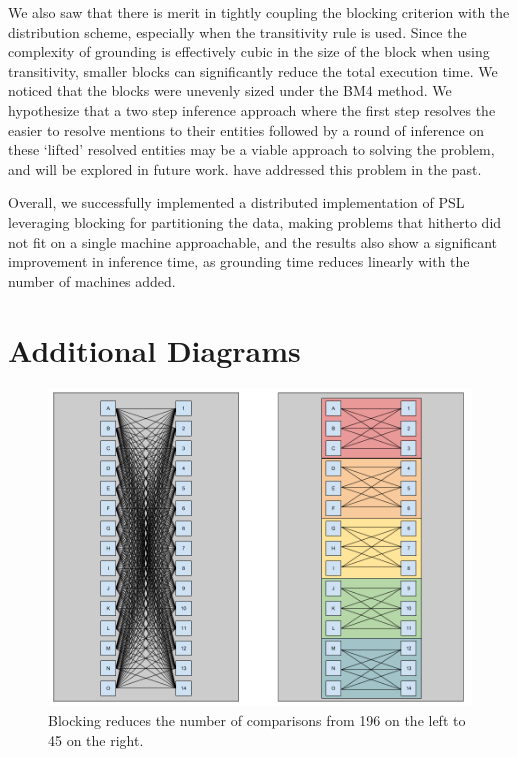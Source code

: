 \documentclass{article}
\begin{document}
    We also saw that there is merit in tightly coupling the blocking criterion with the distribution scheme, especially when the transitivity rule is used. Since the complexity of grounding is effectively cubic in the size of the block when using transitivity, smaller blocks can significantly reduce the total execution time. We noticed that the blocks were unevenly sized under the BM4 method. We hypothesize that a two step inference approach where the first step resolves the easier to resolve mentions to their entities followed by a round of inference on these `lifted' resolved entities may be a viable approach to solving the problem, and will be explored in future work. \cite{wick2009entity} have addressed this problem in the past.
    
    Overall, we successfully implemented a distributed implementation of PSL leveraging blocking for partitioning the data, making problems that hitherto did not fit on a single machine approachable, and the results also show a significant improvement in inference time, as grounding time reduces linearly with the number of machines added.

\appendix
\appendixpage

\section{Additional Diagrams}
    \label{appendix:additional-diagrams}

    \begin{figure}[H]
        \centering
        \includegraphics[width=\textwidth]{images/Blocking.png}
        \caption{Blocking reduces the number of comparisons from 196 on the left to 45 on the right.}
        \label{fig:blocking}
    \end{figure}
\end{document}
